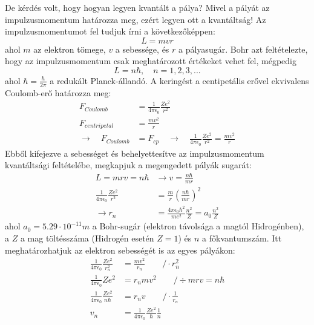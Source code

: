 \documentclass[../main.tex]{subfiles}
\begin{document}
De kérdés volt, hogy hogyan legyen kvantált a pálya? Mivel a pályát az impulzusmomentum határozza meg, ezért legyen ott a kvantáltság! Az impulzusmomentumot fel tudjuk írni a következőképpen:
\begin{equation}
    L = mvr
\end{equation}
ahol $m$ az elektron tömege, $v$ a sebessége, és $r$ a pályasugár. Bohr azt feltételezte, hogy az impulzusmomentum csak meghatározott értékeket vehet fel, mégpedig
\begin{equation}
    L = n \hbar, \quad n = 1,2,3,...
\end{equation}
ahol $\hbar = \frac{h}{2 \pi}$ a redukált Planck-állandó. A keringést a centipetális erővel ekvivalens Coulomb-erő határozza meg:
\begin{equation}
    \begin{aligned}
        F_{Coulomb} &= \frac{1}{4 \pi \epsilon_0} \frac{Z e^2}{r^2} \\
        F_{centripetal} &= \frac{mv^2}{r} \\
        \rightarrow \quad F_{Coulomb} &= F_{cp} \quad \rightarrow \quad \frac{1}{4 \pi \epsilon_0} \frac{Z e^2}{r^2} = \frac{mv^2}{r}
    \end{aligned}
\end{equation}
Ebből kifejezve a sebességet és behelyettesítve az impulzusmomentum kvantáltsági feltételébe, megkapjuk a megengedett pályák sugarát:
\begin{equation}
    \begin{aligned}
        L = mrv = n \hbar &\rightarrow v = \frac{n \hbar}{mr} \\
        \frac{1}{4 \pi \epsilon_0} \frac{Z e^2}{r^2} &= \frac{m}{r} \left( \frac{n \hbar}{mr} \right)^2 \\
        \rightarrow r_n &= \frac{4 \pi \epsilon_0 \hbar^2}{m e^2} \frac{n^2}{Z} = a_0 \frac{n^2}{Z}
    \end{aligned}
\end{equation}
ahol $a_0 = 5.29 \cdot 10^{-11} m$ a Bohr-sugár (elektron távolsága a magtól Hidrogénben), a $Z$ a mag töltésszáma (Hidrogén esetén $Z=1$) és $n$ a főkvantumszám.
Itt meghatározhatjuk az elektron sebességét is az egyes pályákon:
\begin{equation}
    \begin{aligned}
        \frac{1}{4\pi \epsilon_0} \frac{Z e^2}{r_n^2} &= \frac{m v^2}{r_n} \qquad /\cdot r_n^2 \\
        \frac{1}{4\pi \epsilon_0} Z e^2 &= r_n m v^2 \qquad /\div mrv = n\hbar \\
        \frac{1}{4\pi \epsilon_0} \frac{Z e^2}{n \hbar} &= r_n v \qquad /\cdot \frac{1}{r_n} \\
        v_n &= \frac{1}{4 \pi \epsilon_0} \frac{Z e^2}{\hbar} \frac{1}{n}
    \end{aligned}
\end{equation}
\end{document}
